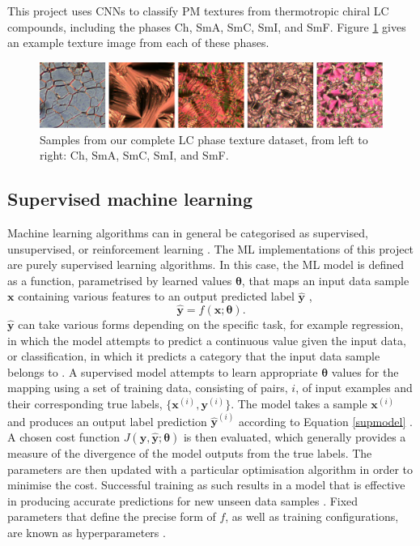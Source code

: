\documentclass[12pt]{article}
\begin{document}
This project uses CNNs to classify PM textures from thermotropic chiral LC compounds, including the phases Ch, SmA, SmC, SmI, and SmF. Figure \ref{textures} gives an example texture image from each of these phases.
\begin{figure}[!h]
\centering
\includegraphics[width=\textwidth]{images/textures.png}
\caption{Samples from our complete LC phase texture dataset, from left to right: Ch, SmA, SmC, SmI, and SmF.}
\label{textures}
\end{figure}  

\subsection{Supervised machine learning}
Machine learning algorithms can in general be categorised as supervised, unsupervised, or reinforcement learning \cite{Murphy12}. The ML implementations of this project are purely supervised learning algorithms. In this case, the ML model is defined as a function, parametrised by learned values $\bm{\theta}$, that maps an input data sample $\bm{x}$ containing various features to an output predicted label $\hat{\bm{y}}$ \cite{Murphy12},
\begin{equation}
\hat{\bm{y}}=f(\bm{x};\bm{\theta}). \label{supmodel} 
\end{equation}
$\hat{\bm{y}}$ can take various forms depending on the specific task, for example regression, in which the model attempts to predict a continuous value given the input data, or classification, in which it predicts a category that the input data sample belongs to \cite{Murphy12}. A supervised model attempts to learn appropriate $\bm{\theta}$ values for the mapping using a set of training data, consisting of pairs, $i$, of input examples and their corresponding true labels, $\lbrace\bm{x}^{(i)},\bm{y}^{(i)}\rbrace$. The model takes a sample $\bm{x}^{(i)}$ and produces an output label prediction $\hat{\bm{y}}^{(i)}$ according to Equation \ref{supmodel} \cite{Murphy12}. A chosen cost function $J(\bm{y},\hat{\bm{y}};\bm{\theta})$ is then evaluated, which generally provides a measure of the divergence of the model outputs from the true labels. The parameters are then updated with a particular optimisation algorithm in order to minimise the cost. Successful training as such results in a model that is effective in producing accurate predictions for new unseen data samples \cite{Murphy12, Goodfellow16}. Fixed parameters that define the precise form of $f$, as well as training configurations, are known as hyperparameters \cite{Murphy12, Goodfellow16}.
\end{document}
